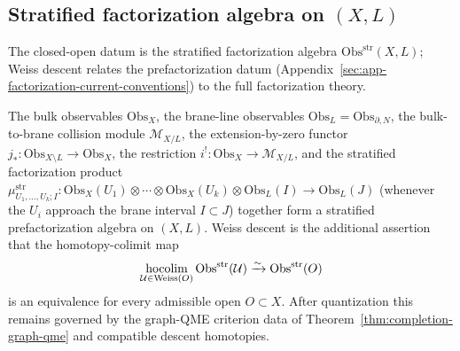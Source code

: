 \subsection{\texorpdfstring{Stratified factorization algebra on \((X,L)\)}{Stratified factorization algebra on (X,L)}}
\label{ssec:completion-stratified-factorization}

The closed-open datum is the stratified factorization algebra
\(\mathrm{Obs}^{\mathrm{str}}(X,L)\); Weiss descent relates the
prefactorization datum (Appendix~\ref{sec:app-factorization-current-conventions})
to the full factorization theory.

\begin{thm}
\label{thm:completion-stratified-factorization}
The bulk observables \(\mathrm{Obs}_X\), the brane-line observables
\(\mathrm{Obs}_L=\mathrm{Obs}_{\partial,N}\), the bulk-to-brane
collision module
\(\mathcal M_{X/L}\), the extension-by-zero functor
\(j_*:\mathrm{Obs}_{X\setminus L}\to\mathrm{Obs}_X\), the
restriction \(i^!:\mathrm{Obs}_X\to\mathcal M_{X/L}\), and the
stratified factorization product
\(\mu^{\mathrm{str}}_{U_1,\ldots,U_k;I}:\mathrm{Obs}_X(U_1)\otimes\cdots
\otimes\mathrm{Obs}_X(U_k)\otimes\mathrm{Obs}_L(I)\to\mathrm{Obs}_L(J)\)
(whenever the \(U_i\) approach the brane interval \(I\subset J\))
together form a stratified prefactorization algebra on \((X,L)\).
Weiss descent is the additional assertion that the homotopy-colimit map
\[
  \operatornamewithlimits{hocolim}_{\mathcal U\in\mathrm{Weiss}(O)}
   \mathrm{Obs}^{\mathrm{str}}(\mathcal U)
  \xrightarrow{\sim}\mathrm{Obs}^{\mathrm{str}}(O)
\]
is an equivalence for every admissible open \(O\subset X\).  After
quantization this remains governed by the graph-QME criterion data of
Theorem~\ref{thm:completion-graph-qme} and compatible descent
homotopies.
\end{thm}

